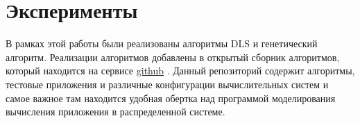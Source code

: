 \chapter*{Эксперименты}
\begin{spacing}{1.3}

В рамках этой работы были реализованы алгоритмы DLS и генетический алгоритм.  Реализации алгоритмов добавлены в открытый сборник алгоритмов, который находится на сервисе \href{https://github.com/alexmnazarenko/pysimgrid}{github} \cite{GIT}. Данный репозиторий содержит алгоритмы, тестовые приложения и различные конфигурации вычислительных систем и самое важное там находится удобная обертка над программой моделирования вычисления приложения в распределенной системе.

\end{spacing}